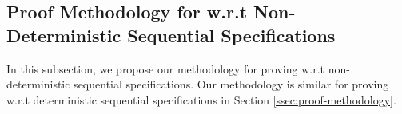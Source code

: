 {\subsection{Proof Methodology for \crdtlin{} w.r.t Non-Deterministic Sequential Specifications}
\label{subsec:appendix proof methodology for RA-linearizability w.r.t non-deterministic sequential specifications}

In this subsection, we propose our methodology for proving \crdtlin{} w.r.t non-deterministic sequential specifications. Our methodology is similar for proving \crdtlin{} w.r.t deterministic sequential specifications in Section \ref{ssec:proof-methodology}.








}
